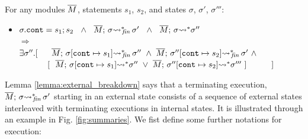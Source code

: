 \begin{auxLemma}
\label{lemma:subexp}
For any modules $\overline{M}$, statements $s_1$, $s_2$, and states $\sigma$, $\sigma'$, $\sigma'''$:
\begin{itemize}
\item
$ \sigma.\texttt{cont} = s_1; s_2 \ \ \wedge\ \  \leadstoBoundedStarFin {\Mtwo}  {\sigma}  {\sigma'}\ \ 
\wedge \ \
\leadstoBoundedStar {\Mtwo}  {\sigma}  {\sigma''}\
$\\
$  \Longrightarrow$\\
$   \exists \sigma''.[\ \ \ \ \   \leadstoBoundedStarFin {\Mtwo} {\sigma[\texttt{cont}\mapsto s_1]}  {\sigma''}  
\ \wedge\ 
\leadstoBoundedStarFin {\Mtwo} {\sigma''[\texttt{cont}\mapsto s_2]}   {\sigma'} \  \wedge$
\\
$\strut \hspace{1.2cm}  [ \ \ \leadstoBoundedStar {\Mtwo} {\sigma[\texttt{cont}\mapsto s_1]}   {\sigma''}\ \vee \ \leadstoBoundedStar {\Mtwo}  {\sigma''[\texttt{cont}\mapsto s_2]}   {\sigma'''}\ ]\ \ \ \ \ \ \ \  \ ] $
\end{itemize}
\end{auxLemma}
 

Lemma \ref{lemma:external_breakdown} says that a terminating execution,  $ \overline{M};\, {\sigma} {\rightsquigarrow^*}\!\!_{\mathit{fin}}\, \sigma'$ starting in an external state  consists of a sequence of  external states interleaved with terminating executions in internal states. 
It %
is illustrated through an example in Fig. \ref{fig:summaries}.
We fist define some further notations for execution:

